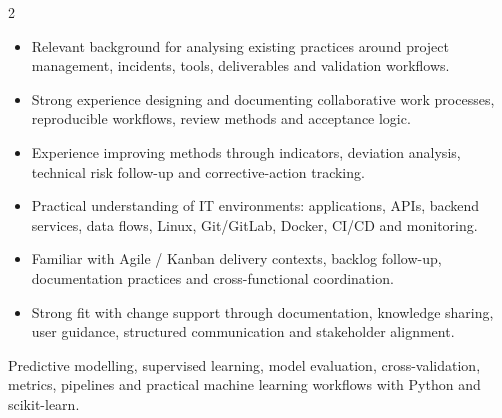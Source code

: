 \documentclass[8pt,a4paper,ragged2e,withhyper]{altacv}
\begin{document}
\begin{paracol}{2}
\begin{itemize}
  \item Relevant background for analysing existing practices around project management, incidents, tools, deliverables and validation workflows.
  \item Strong experience designing and documenting collaborative work processes, reproducible workflows, review methods and acceptance logic.
  \item Experience improving methods through indicators, deviation analysis, technical risk follow-up and corrective-action tracking.
  \item Practical understanding of IT environments: applications, APIs, backend services, data flows, Linux, Git/GitLab, Docker, CI/CD and monitoring.
  \item Familiar with Agile / Kanban delivery contexts, backlog follow-up, documentation practices and cross-functional coordination.
  \item Strong fit with change support through documentation, knowledge sharing, user guidance, structured communication and stakeholder alignment.
\end{itemize}


\divider
{}
\divider

\medskip



\divider


\divider


\divider


\end{paracol}



\small{Predictive modelling, supervised learning, model evaluation, cross-validation, metrics, pipelines and practical machine learning workflows with Python and scikit-learn.}
\end{document}
